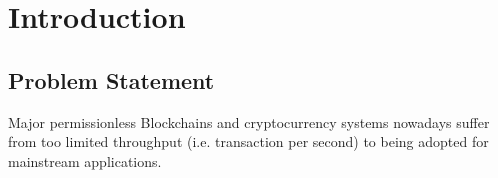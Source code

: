 \section{Introduction}
\subsection{Problem Statement}
Major permissionless Blockchains and cryptocurrency systems \cite{nakamoto2008bitcoin, buterin2014ethereum} nowadays suffer from too limited throughput (i.e. transaction per second) to being adopted for mainstream applications.
